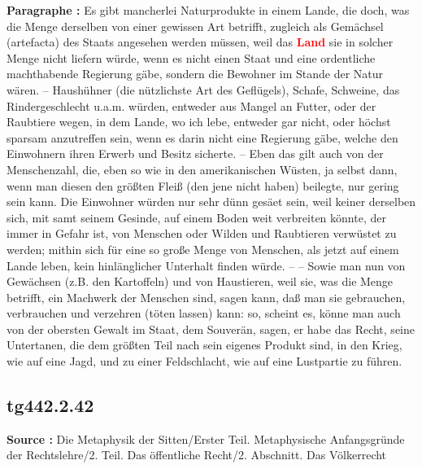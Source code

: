 \documentclass[a4paper,12pt,twoside]{book}
\newcommand{\match}[1]{\textcolor{red}{\textbf{#1}}}
\begin{document}
	\textbf{Paragraphe : }Es gibt mancherlei Naturprodukte in einem Lande, die doch, was die Menge derselben von einer gewissen Art betrifft, zugleich als Gemächsel (artefacta) des Staats angesehen werden müssen, weil das \match{Land} sie in solcher Menge nicht liefern würde, wenn es nicht einen Staat und eine ordentliche machthabende Regierung gäbe, sondern die Bewohner im Stande der Natur wären. – Haushühner (die nützlichste Art des Geflügels), Schafe, Schweine, das Rindergeschlecht u.a.m. würden, entweder aus Mangel an Futter, oder der Raubtiere wegen, in dem Lande, wo ich lebe, entweder gar nicht, oder höchst sparsam anzutreffen sein, wenn es darin nicht eine Regierung gäbe, welche den Einwohnern ihren Erwerb und Besitz sicherte. – Eben das gilt auch von der Menschenzahl, die, eben so wie in den amerikanischen Wüsten, ja selbst dann, wenn man diesen den größten Fleiß (den jene nicht haben) beilegte, nur gering sein kann. Die Einwohner würden nur sehr dünn gesäet sein, weil keiner derselben sich, mit samt seinem Gesinde, auf einem Boden weit verbreiten könnte, der immer in Gefahr ist, von Menschen oder Wilden und Raubtieren verwüstet zu werden; mithin sich für eine so große Menge von Menschen, als jetzt auf einem Lande leben, kein hinlänglicher Unterhalt finden würde. – – Sowie man nun von Gewächsen (z.B. den Kartoffeln) und von Haustieren, weil sie, was die Menge betrifft, ein Machwerk der Menschen sind, sagen kann, daß man sie gebrauchen, verbrauchen und verzehren (töten lassen) kann: so, scheint es, könne man auch von der obersten Gewalt im Staat, dem Souverän, sagen, er  habe das Recht, seine Untertanen, die dem größten Teil nach sein eigenes Produkt sind, in den Krieg, wie auf eine Jagd, und zu einer Feldschlacht, wie auf eine Lustpartie zu führen. 
	
	\subsection*{tg442.2.42} 
	\textbf{Source : }Die Metaphysik der Sitten/Erster Teil. Metaphysische Anfangsgründe der Rechtslehre/2. Teil. Das öffentliche Recht/2. Abschnitt. Das Völkerrecht\\  
	
\end{document}
